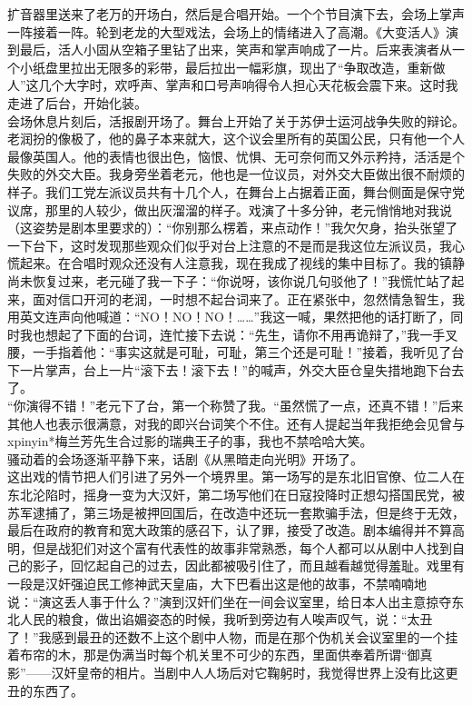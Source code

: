 扩音器里送来了老万的开场白，然后是合唱开始。一个个节目演下去，会场上掌声一阵接着一阵。轮到老龙的大型戏法，会场上的情绪进入了高潮。《大变活人》演到最后，活人小固从空箱子里钻了出来，笑声和掌声响成了一片。后来表演者从一个小纸盘里拉出无限多的彩带，最后拉出一幅彩旗，现出了“争取改造，重新做人”这几个大字时，欢呼声、掌声和口号声响得令人担心天花板会震下来。这时我走进了后台，开始化装。\\

会场休息片刻后，活报剧开场了。舞台上开始了关于苏伊士运河战争失败的辩论。老润扮的像极了，他的鼻子本来就大，这个议会里所有的英国公民，只有他一个人最像英国人。他的表情也很出色，恼恨、忧惧、无可奈何而又外示矜持，活活是个失败的外交大臣。我身旁坐着老元，他也是一位议员，对外交大臣做出很不耐烦的样子。我们工党左派议员共有十几个人，在舞台上占据着正面，舞台侧面是保守党议席，那里的人较少，做出灰溜溜的样子。戏演了十多分钟，老元悄悄地对我说（这姿势是剧本里要求的）：“你别那么楞着，来点动作！”我欠欠身，抬头张望了一下台下，这时发现那些观众们似乎对台上注意的不是而是我这位左派议员，我心慌起来。在合唱时观众还没有人注意我，现在我成了视线的集中目标了。我的镇静尚未恢复过来，老元碰了我一下子：“你说呀，该你说几句驳他了！”我慌忙站了起来，面对信口开河的老润，一时想不起台词来了。正在紧张中，忽然情急智生，我用英文连声向他喊道：“NO！NO！NO！……”我这一喊，果然把他的话打断了，同时我也想起了下面的台词，连忙接下去说：“先生，请你不用再诡辩了，”我一手叉腰，一手指着他：“事实这就是可耻，可耻，第三个还是可耻！”接着，我听见了台下一片掌声，台上一片“滚下去！滚下去！”的喊声，外交大臣仓皇失措地跑下台去了。\\

“你演得不错！”老元下了台，第一个称赞了我。“虽然慌了一点，还真不错！”后来其他人也表示很满意，对我的即兴台词笑个不住。还有人提起当年我拒绝会见曾与xpinyin*{梅兰芳}先生合过影的瑞典王子的事，我也不禁哈哈大笑。\\

骚动着的会场逐渐平静下来，话剧《从黑暗走向光明》开场了。\\

这出戏的情节把人们引进了另外一个境界里。第一场写的是东北旧官僚、位二人在东北沦陷时，摇身一变为大汉奸，第二场写他们在日寇投降时正想勾搭国民党，被苏军逮捕了，第三场是被押回国后，在改造中还玩一套欺骗手法，但是终于无效，最后在政府的教育和宽大政策的感召下，认了罪，接受了改造。剧本编得并不算高明，但是战犯们对这个富有代表性的故事非常熟悉，每个人都可以从剧中人找到自己的影子，回忆起自己的过去，因此都被吸引住了，而且越看越觉得羞耻。戏里有一段是汉奸强迫民工修神武天皇庙，大下巴看出这是他的故事，不禁喃喃地说：“演这丢人事于什么？”演到汉奸们坐在一间会议室里，给日本人出主意掠夺东北人民的粮食，做出谄媚姿态的时候，我听到旁边有人唉声叹气，说：“太丑了！”我感到最丑的还数不上这个剧中人物，而是在那个伪机关会议室里的一个挂着布帘的木，那是伪满当时每个机关里不可少的东西，里面供奉着所谓“御真影”——汉奸皇帝的相片。当剧中人人场后对它鞠躬时，我觉得世界上没有比这更丑的东西了。\\


